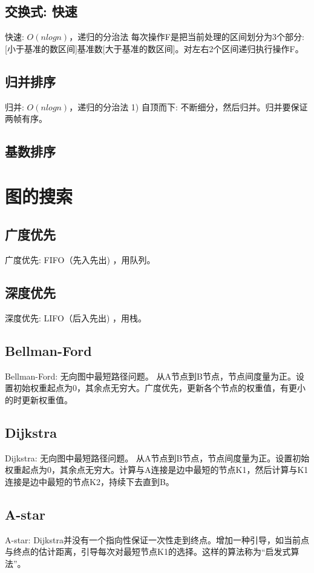 \documentclass[UTF8]{../computerUniverse}
\begin{document}
\subsection{交换式: 快速}    
快速: $O(nlogn)$，递归的分治法
每次操作F是把当前处理的区间划分为3个部分: [小于基准的数区间]基准数[大于基准的数区间]。对左右2个区间递归执行操作F。


\subsection{归并排序}

归并: $O(nlogn)$，递归的分治法
1) 自顶而下: 不断细分，然后归并。归并要保证两帧有序。


\subsection{基数排序}




\section{图的搜索}

\subsection{广度优先}
广度优先: FIFO（先入先出) ，用队列。


\subsection{深度优先}
深度优先: LIFO（后入先出) ，用栈。


\subsection{Bellman-Ford}
Bellman-Ford: 无向图中最短路径问题。
从A节点到B节点，节点间度量为正。设置初始权重起点为0，其余点无穷大。广度优先，更新各个节点的权重值，有更小的时更新权重值。


\subsection{Dijkstra}
Dijkstra: 无向图中最短路径问题。
从A节点到B节点，节点间度量为正。设置初始权重起点为0，其余点无穷大。计算与A连接是边中最短的节点K1，然后计算与K1连接是边中最短的节点K2，持续下去直到B。


\subsection{A-star}
A-star: Dijkstra并没有一个指向性保证一次性走到终点。增加一种引导，如当前点与终点的估计距离，引导每次对最短节点K1的选择。这样的算法称为“启发式算法”。
\end{document}
